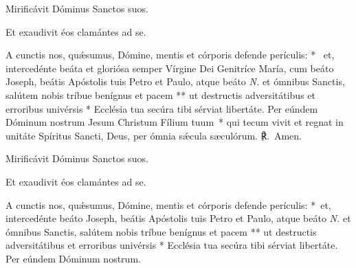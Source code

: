 \vv Mirificávit Dóminus Sanctos suos.

\rr Et exaudivit éos clamántes ad se.

\oratio

\lettrine{A}{} cunctis nos, quǽsumus, Dómine, mentis et córporis defende perículis: \nolinebreak[4]*~ et, intercedénte beáta et gloriósa semper Vírgine Dei Genitríce María, cum beáto Joseph, beátis Apóstolis tuis Petro et Paulo, atque beáto \textit{N.} et ómnibus Sanctis, salútem nobis tríbue benígnus et pacem ** ut destructis adversitátibus et erroribus univérsis * Ecclésia tua secúra tibi sérviat libertáte. Per eúndem Dóminum nostrum Jesum Christum Fílium tuum~* qui tecum vivit et regnat in unitáte Spíritus Sancti, Deus, per ómnia sǽcula sæculórum. ℟.~Amen.



\vv Mirificávit Dóminus Sanctos suos.

\rr Et exaudivit éos clamántes ad se.

\oratio

\lettrine{A}{} cunctis nos, quǽsumus, Dómine, mentis et córporis defende perículis: \nolinebreak[4]*~et, intercedénte beáto Joseph, beátis Apóstolis tuis Petro et Paulo, atque beáto \textit{N.} et ómnibus Sanctis, salútem nobis tríbue benígnus et pacem ** ut destructis adversitátibus et erroribus univérsis * Ecclésia tua secúra tibi sérviat libertáte. Per eúndem Dóminum nostrum.